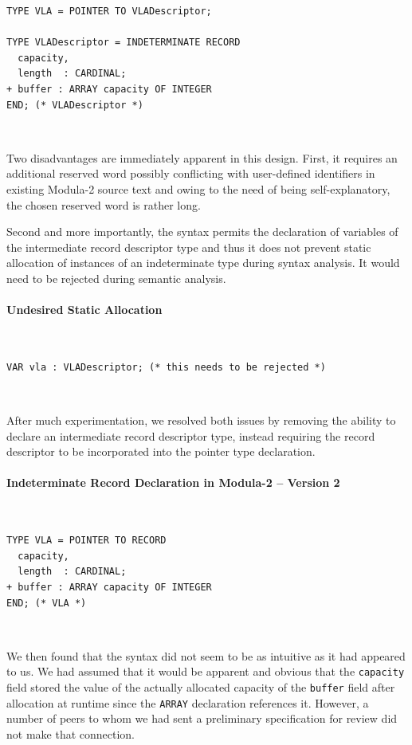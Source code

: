 \documentclass[10pt,a4paper]{article}
\newcommand\sourcecaption[1]{\noindent\normalfont\small\textsf{#1}}
\begin{document}
\lstset{style=modula2}
\begin{lstlisting}
TYPE VLA = POINTER TO VLADescriptor;

TYPE VLADescriptor = INDETERMINATE RECORD
  capacity,
  length  : CARDINAL;
+ buffer : ARRAY capacity OF INTEGER
END; (* VLADescriptor *)
\end{lstlisting}~

\par\noindent Two disadvantages are immediately apparent in this design. First,
it requires an additional reserved word possibly conflicting with user-defined
identifiers in existing Modula-2 source text and owing to the need of being
self-explanatory, the chosen reserved word is rather long.

Second and more importantly, the syntax permits the declaration of variables
of the intermediate record descriptor type and thus it does not prevent static
allocation of instances of an indeterminate type during syntax analysis. It
would need to be rejected during semantic analysis.

\paragraph{\sourcecaption{Undesired Static Allocation}}~
\lstset{style=modula2}
\begin{lstlisting}
VAR vla : VLADescriptor; (* this needs to be rejected *)

\end{lstlisting}~

\par\noindent After much experimentation, we resolved both issues by removing
the ability to declare an intermediate record descriptor type, instead
requiring the record descriptor to be incorporated into the pointer type
declaration.

\paragraph{\sourcecaption{Indeterminate Record Declaration in Modula-2
-- Version 2}}~

\lstset{style=modula2}
\begin{lstlisting}
TYPE VLA = POINTER TO RECORD
  capacity,
  length  : CARDINAL;
+ buffer : ARRAY capacity OF INTEGER
END; (* VLA *)
\end{lstlisting}~

\par\noindent We then found that the syntax did not seem to be as intuitive as
it had appeared to us. We had assumed that it would be apparent and obvious
that the \verb|capacity| field stored the value of the actually allocated
capacity of the \verb|buffer| field after allocation at runtime since the
\verb|ARRAY| declaration references it. However, a number of peers to whom we
had sent a preliminary specification for review did not make that connection.
\end{document}
